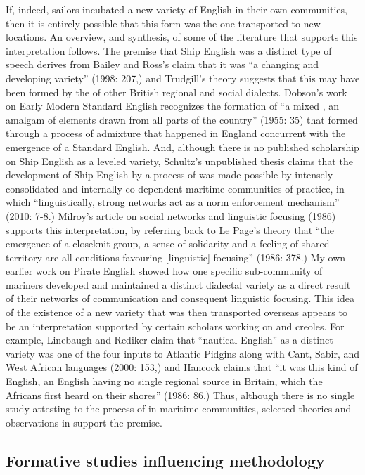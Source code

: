 If, indeed, sailors incubated a new variety of English in their own communities, then it is entirely possible that this form was the one transported to new locations. An overview, and synthesis, of some of the literature that supports this interpretation follows. The premise that Ship English was a distinct type of speech derives from Bailey and Ross’s claim that it was “a changing and developing variety” (1998: 207,) and Trudgill’s theory suggests that this may have been formed by the  of other British regional and social dialects. Dobson’s work on Early Modern Standard English recognizes the formation of “a mixed , an amalgam of elements drawn from all parts of the country” (1955: 35) that formed through a process of admixture that happened in England concurrent with the emergence of a Standard English. And, although there is no published scholarship on Ship English as a leveled variety, Schultz’s unpublished thesis claims that the development of Ship English by a process of   was made possible by intensely consolidated and internally co-dependent maritime communities of practice, in which “linguistically, strong networks act as a norm enforcement mechanism” (2010: 7-8.) Milroy’s article on social networks and linguistic focusing (1986) supports this interpretation, by referring back to Le Page’s theory that “the emergence of a closeknit group, a sense of solidarity and a feeling of shared territory are all conditions favouring [linguistic] focusing” (1986: 378.) My own earlier work on Pirate English \citep{Delgado2013} showed how one specific sub-community of mariners developed and maintained a distinct dialectal variety as a direct result of their networks of communication and consequent linguistic focusing. This idea of the existence of a new variety that was then transported overseas appears to be an interpretation supported by certain scholars working on  and creoles.  For example, Linebaugh and Rediker claim that “nautical English” as a distinct variety was one of the four inputs to Atlantic Pidgins along with Cant, Sabir, and West African languages (2000: 153,) and Hancock claims that “it was this kind of English, an English having no single regional source in Britain, which the Africans first heard on their shores” (1986: 86.) Thus, although there is no single study attesting to the process of  in maritime communities, selected theories and observations in  support the premise. 

\subsection{{Formative} {studies} {influencing} {methodology}}%

